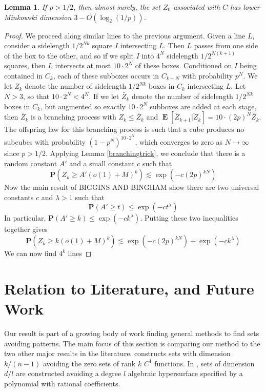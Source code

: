 \documentclass[dvipsnames,letterpaper,12pt]{article}
\theoremstyle{plain}
\newtheorem{lemma}{Lemma}
\DeclareMathOperator{\Expect}{\mathbf{E}}
\begin{document}
\begin{lemma}
	If $p > 1/2$, then almost surely, the set $Z_0$ associated with $C$ has lower Minkowski dimension $3 - O(\log_2(1/p))$.
\end{lemma}
\begin{proof}
	We proceed along similar lines to the previous argument. Given a line $L$, consider a sidelength $1/2^{Nk}$ square $I$ intersecting $L$. Then $L$ passes from one side of the box to the other, and so if we split $I$ into $4^N$ sidelength $1/2^{N(k+1)}$ squares, then $L$ intersects at most $10 \cdot 2^N$ of these boxes. Conditioned on $I$ being contained in $C_k$, each of these subboxes occurs in $C_{k+N}$ with probability $p^N$. We let $Z_k$ denote the number of sidelength $1/2^{Nk}$ boxes in $C_k$ intersecting $L$. Let $N > 3$, so that $10 \cdot 2^N < 4^N$. If we let $\tilde{Z_k}$ denote the number of sidelength $1/2^{Nk}$ boxes in $C_k$, but augmented so exactly $10 \cdot 2^N$ subboxes are added at each stage, then $\tilde{Z_k}$ is a branching process with $Z_k \leq \tilde{Z_k}$ and $\Expect[\tilde{Z}_{k+1}|\tilde{Z}_k] = 10 \cdot (2p)^N \tilde{Z_k}$. The offspring law for this branching process is such that a cube produces no subcubes with probability $(1 - p^N)^{10 \cdot 2^N}$, which converges to zero as $N \to \infty$ since $p > 1/2$. Applying Lemma \ref{branchingtrick}, we conclude that there is a random constant $A'$ and a small constant $c$ such that
	\[ \mathbf{P}(Z_k \geq A' (o(1) + M)^k) \lesssim \exp(-c (2p)^{kN}) \]
	Now the main result of BIGGINS AND BINGHAM show there are two universal constants $c$ and $\lambda > 1$ such that
	\[ \mathbf{P}(A' \geq t) \leq \exp(-c t^\lambda) \]
	In particular, $\mathbf{P}(A' \geq k) \leq \exp(-ck^\lambda)$. Putting these two inequalities together gives
	\[ \mathbf{P}(Z_k \geq k(o(1) + M)^k) \lesssim \exp(-c (2p)^{kN}) + \exp(-c k^\lambda) \]
	We can now find $4^k$ lines 
\end{proof}











\section{Relation to Literature, and Future Work}\label{futureWorkSection}

Our result is part of a growing body of work finding general methods to find sets avoiding patterns. The main focus of this section is comparing our method to the two other major results in the literature. \cite{MalabikaRob} constructs sets with dimension $k/(n-1)$ avoiding the zero sets of rank $k$ $C^1$ functions. In \cite{Mathe}, sets of dimension $d/l$ are constructed avoiding a degree $l$ algebraic hypersurface specified by a polynomial with rational coefficients.
\end{document}
